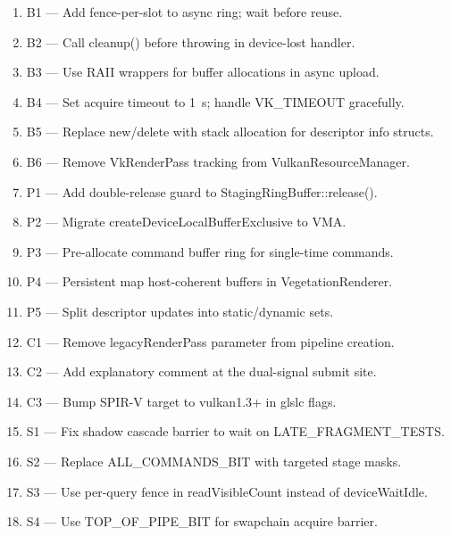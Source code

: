 \documentclass[a4paper,12pt]{article}
\begin{document}
\begin{enumerate}[noitemsep]
  \item B1 — Add fence-per-slot to async ring; wait before reuse.
  \item B2 — Call cleanup() before throwing in device-lost handler.
  \item B3 — Use RAII wrappers for buffer allocations in async upload.
  \item B4 — Set acquire timeout to 1~s; handle VK\_TIMEOUT gracefully.
  \item B5 — Replace new/delete with stack allocation for descriptor info structs.
  \item B6 — Remove VkRenderPass tracking from VulkanResourceManager.
  \item P1 — Add double-release guard to StagingRingBuffer::release().
  \item P2 — Migrate createDeviceLocalBufferExclusive to VMA.
  \item P3 — Pre-allocate command buffer ring for single-time commands.
  \item P4 — Persistent map host-coherent buffers in VegetationRenderer.
  \item P5 — Split descriptor updates into static/dynamic sets.
  \item C1 — Remove legacyRenderPass parameter from pipeline creation.
  \item C2 — Add explanatory comment at the dual-signal submit site.
  \item C3 — Bump SPIR-V target to vulkan1.3+ in glslc flags.
  \item S1 — Fix shadow cascade barrier to wait on LATE\_FRAGMENT\_TESTS.
  \item S2 — Replace ALL\_COMMANDS\_BIT with targeted stage masks.
  \item S3 — Use per-query fence in readVisibleCount instead of deviceWaitIdle.
  \item S4 — Use TOP\_OF\_PIPE\_BIT for swapchain acquire barrier.
\end{enumerate}
\end{document}
